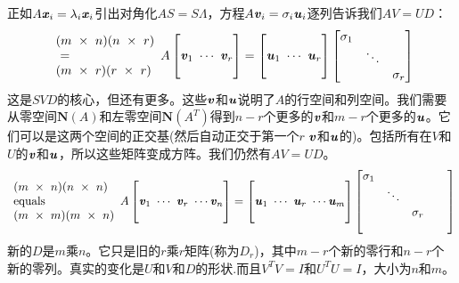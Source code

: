 正如$ A\textbf{\textit{x}}_{i}=\lambda_{i}\textbf{\textit{x}}_{i}$引出对角化$AS=S\Lambda$，方程$A\textbf{\textit{v}}_{i}=\sigma_{i}\textbf{\textit{u}}_{i}$逐列告诉我们$AV = UD$：
\begin{align}
\begin{array}{l}
(m \ \times \ n)(n \ \times \ r) \\
\ \text{=} \\              
(m \ \times \ r) (r \ \times \ r)
\end{array}  A
\begin{bmatrix}
\ \\
\textbf{\textit{v}}_{1} \ \cdots \ \textbf{\textit{v}}_{r}\\
\ 
\end{bmatrix}=
\begin{bmatrix}
\ \\
\textbf{\textit{u}}_{1} \ \cdots \ \textbf{\textit{u}}_{r}\\
\ 
\end{bmatrix}
\begin{bmatrix}
\sigma_{1}  & & \\
& \ddots &\\
& & \sigma_{r} 
\end{bmatrix}
\end{align}
这是$SVD$的核心，但还有更多。这些$\textbf{\textit{v}}$和$\textbf{\textit{u}}$说明了$A$的行空间和列空间。我们需要从零空间$ \textbf{N}(A)$和左零空间$ \textbf{N}(A^{T})$得到$n-r$个更多的$\textbf{\textit{v}}$和$m-r$个更多的$\textbf{\textit{u}}$。它们可以是这两个空间的正交基(然后自动正交于第一个$r$ $\textbf{\textit{v}}$和$\textbf{\textit{u}}$的)。包括所有在$V$和$U$的$\textbf{\textit{v}}$和$\textbf{\textit{u}}$，所以这些矩阵变成方阵。我们仍然有$AV = UD$。
\begin{align}
\begin{array}{l}
(m \ \times \ n)(n \ \times \ n) \\
\text{equals} \\              
(m \ \times \ m) (m \ \times \ n)
\end{array}  A
\begin{bmatrix}
\ \\
\textbf{\textit{v}}_{1} \ \cdots \ \textbf{\textit{v}}_{r} \ \cdots \textbf{\textit{v}}_{n}\\
\ 
\end{bmatrix}=
\begin{bmatrix}
\ \\
\textbf{\textit{u}}_{1} \ \cdots \ \textbf{\textit{u}}_{r} \ \cdots \textbf{\textit{u}}_{m}\\
\ 
\end{bmatrix}
\begin{bmatrix}
\sigma_{1}  & & &\\
& \ddots & &\\
& & \sigma_{r} & \\
& & & & 
\end{bmatrix}
\end{align}
新的$D$是$m$乘$n$。它只是旧的$r$乘$r$矩阵(称为$D_{r}$)，其中$m-r$个新的零行和$n-r$个新的零列。真实的变化是$U$和$V$和$D$的形状.而且$V^{T }V = I$和$U^{T }U=I$，大小为$n$和$m$。

